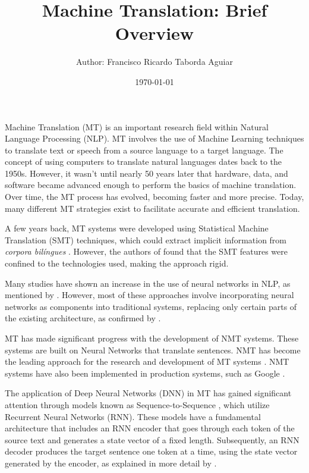 \documentclass[a4paper]{article}
\title{
    Machine Translation: Brief Overview\\
}
\author{
    \small{Author: Francisco Ricardo Taborda Aguiar}\\
}
\date{\today}
\begin{document}
    \maketitle

    Machine Translation (MT) is an important research field within 
    Natural Language Processing (NLP). MT involves the use of Machine 
    Learning techniques to translate text or speech from a source 
    language to a target language. The concept of using computers 
    to translate natural languages dates back to the 1950s. 
    However, it wasn't until nearly 50 years later that hardware, 
    data, and software became advanced enough to perform the basics 
    of machine translation. Over time, the MT process has evolved, 
    becoming faster and more precise. Today, many different MT 
    strategies exist to facilitate accurate and efficient translation.

    A few years back, MT systems were developed using Statistical Machine 
    Translation (SMT) techniques, which could extract implicit information 
    from \emph{corpora bil\'ingues} \cite{brown:1993}. However, the authors 
    of \cite{maruf:2021} found that the SMT features were confined to the 
    technologies used, making the approach rigid.

    Many studies have shown an increase in the use of neural networks in 
    NLP, as mentioned by \cite{goldberg:2016}. However, most of these 
    approaches involve incorporating neural networks as components into 
    traditional systems, replacing only certain parts of the existing 
    architecture, as confirmed by \cite{stahlberg:2020}.

    MT has made significant progress with the development of NMT systems. 
    These systems are built on Neural Networks that translate sentences. 
    NMT has become the leading approach for the research and development 
    of MT systems \cite{tan:2020}. NMT systems have also been implemented 
    in production systems, such as Google \cite{wu:2016}.

    The application of Deep Neural Networks (DNN) in MT has gained 
    significant attention through models known as Sequence-to-Sequence
    \cite{gehring:2017}, which utilize Recurrent Neural Networks (RNN). 
    These models have a fundamental architecture that includes an RNN 
    encoder that goes through each token of the source text and generates 
    a state vector of a fixed length. Subsequently, an RNN decoder produces 
    the target sentence one token at a time, using the state vector 
    generated by the encoder, as explained in more detail by 
    \cite{sutskever:2014}.    
\end{document}
